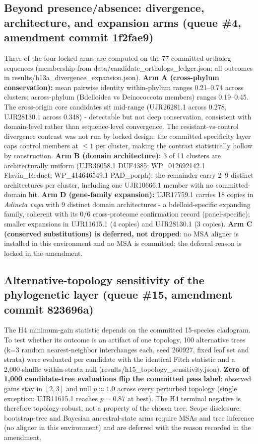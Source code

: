 \documentclass[12pt,a4paper]{article}
\begin{document}
\subsection{Beyond presence/absence: divergence, architecture, and expansion arms (queue \#4, amendment commit 1f2fae9)}
Three of the four locked arms are computed on the 77 committed ortholog sequences (membership from data/candidate\_orthologs\_ledger.json; all outcomes in results/h13a\_divergence\_expansion.json). \textbf{Arm A (cross-phylum conservation):} mean pairwise identity within-phylum ranges 0.21--0.74 across clusters; across-phylum (Bdelloidea vs Deinococcota members) ranges 0.19--0.45. The cross-origin core candidates sit mid-range (UJR26281.1 across 0.278, UJR28130.1 across 0.348) - detectable but not deep conservation, consistent with domain-level rather than sequence-level convergence. The resistant-vs-control divergence contrast was not run by locked design: the committed specificity layer caps control members at $\leq 1$ per cluster, making the contrast statistically hollow by construction. \textbf{Arm B (domain architecture):} 3 of 11 clusters are architecturally uniform (UJR36058.1 DUF4385; WP\_012692142.1 Flavin\_Reduct; WP\_414646549.1 PAD\_porph); the remainder carry 2--9 distinct architectures per cluster, including one UJR10666.1 member with no committed-domain hit. \textbf{Arm D (gene-family expansion):} UJR17759.1 carries 18 copies in \emph{Adineta vaga} with 9 distinct domain architectures - a bdelloid-specific expanding family, coherent with its 0/6 cross-proteome confirmation record (panel-specific); smaller expansions in UJR11615.1 (4 copies) and UJR28130.1 (3 copies). \textbf{Arm C (conserved substitutions) is deferred, not dropped}: no MSA aligner is installed in this environment and no MSA is committed; the deferral reason is locked in the amendment.


\subsection{Alternative-topology sensitivity of the phylogenetic layer (queue \#15, amendment commit 823696a)}
The H4 minimum-gain statistic depends on the committed 15-species cladogram. To test whether its outcome is an artifact of one topology, 100 alternative trees (k=3 random nearest-neighbor interchanges each, seed 260927, fixed leaf set and strata) were evaluated per candidate with the identical Fitch statistic and a 2{,}000-shuffle within-strata null (results/h15\_topology\_sensitivity.json). \textbf{Zero of 1{,}000 candidate-tree evaluations flip the committed pass label}: observed gains stay in $[2,3]$ and null $p \approx 1.0$ across every perturbed topology (single exception: UJR11615.1 reaches $p=0.87$ at best). The H4 terminal negative is therefore topology-robust, not a property of the chosen tree. Scope disclosure: bootstrap-tree and Bayesian ancestral-state arms require MSAs and tree inference (no aligner in this environment) and are deferred with the reason recorded in the amendment.
\end{document}
